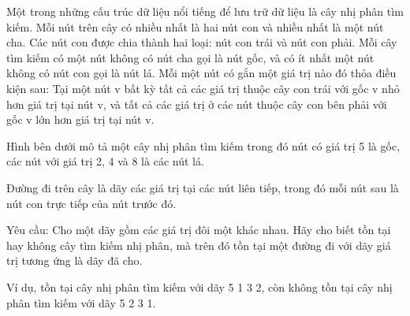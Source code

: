 Một trong những cấu trúc dữ liệu nổi tiếng để lưu trữ dữ liệu là cây nhị phân tìm kiếm. Mỗi nút trên cây có nhiều nhất là hai nút con và nhiều nhất là một nút cha. Các nút con được chia thành hai loại: nút con trái và nút con phải. Mỗi cây tìm kiếm có một nút không có nút cha gọi là nút gốc, và có ít nhất một nút không có nút con gọi là nút lá. Mỗi một nút có gắn một giá trị nào đó thỏa điều kiện sau: Tại một nút v bất kỳ tất cả các giá trị thuộc cây con trái với gốc v nhỏ hơn giá trị tại nút v, và tất cả các giá trị ở các nút thuộc cây con bên phải với gốc v lớn hơn giá trị tại nút v.  

   Hình bên dưới mô tả một cây nhị phân tìm kiếm trong đó nút có giá trị 5 là gốc, các nút với giá trị 2, 4 và 8 là các nút lá.  

   Đường đi trên cây là dãy các giá trị tại các nút liên tiếp, trong đó mỗi nút sau là nút con trực tiếp của nút trước đó.  

   Yêu cầu: Cho một dãy gồm các giá trị đôi một khác nhau. Hãy cho biết tồn tại hay không cây tìm kiếm nhị phân, mà trên đó tồn tại một đường đi với dãy giá trị tương ứng là dãy đã cho.  

   Ví dụ, tồn tại cây nhị phân tìm kiếm với dãy 5 1 3 2, còn không tồn tại cây nhị phân tìm kiếm với dãy 5 2 3 1.